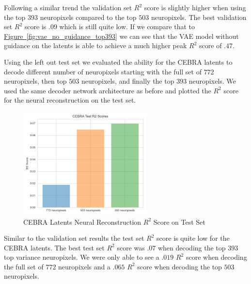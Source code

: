 \documentclass[12pt, letterpaper]{article}
\begin{document}
Following a similar trend the validation set $R^2$ score is slightly higher when using the top $393$ neuropixels compared to the top $503$ neuropixels. The best validation set $R^2$ score is $.09$ which is still quite low. If we compare that to \hyperref[fig:vae_no_guidance_top393]{Figure~\ref{fig:vae_no_guidance_top393}} we can see that the VAE model without guidance on the latents is able to achieve a much higher peak $R^2$ score of $.47$.

Using the left out test set we evaluated the ability for the CEBRA latents to decode different number of neuropixels starting with the full set of $772$ neuropixels, then top $503$ neuropixels, and finally the top $393$ neuropixels. We used the same decoder network architecture as before and plotted the $R^2$ score for the neural reconstruction on the test set.

\begin{figure}[H]
    \centering
    \includegraphics[width=0.6\textwidth]{cebra_test_r2_scores.png}
    \caption{CEBRA Latents Neural Reconstruction $R^2$ Score on Test Set}
    \label{fig:cebra_latents_neural_reconstruction_test_set}
\end{figure}

Similar to the validation set results the test set $R^2$ score is quite low for the CEBRA \cite{schneider2023} latents. The best test set $R^2$ score was $.07$ when decoding the top $393$ top variance neuropixels. We were only able to see a $.019$ $R^2$ score when decoding the full set of $772$ neuropixels and a $.065$ $R^2$ score when decoding the top $503$ neuropixels.
\end{document}
